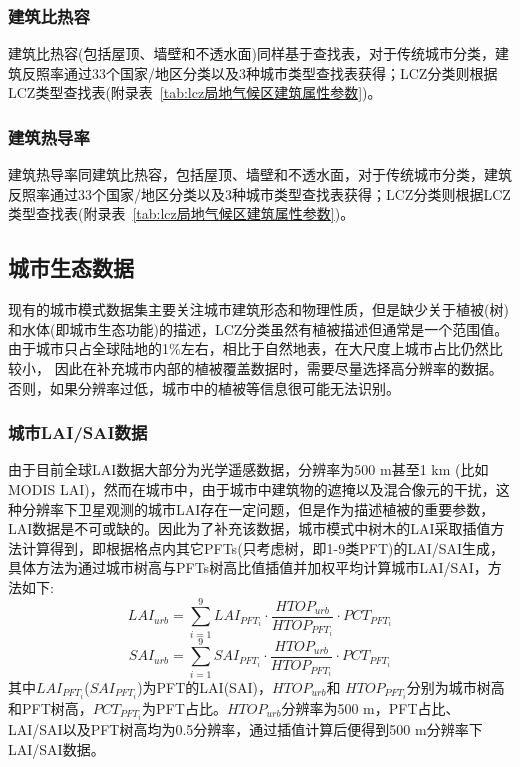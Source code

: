 \subsubsection{建筑比热容}\label{建筑比热容}
建筑比热容(包括屋顶、墙壁和不透水面)同样基于查找表，对于传统城市分类，建筑反照率通过33个国家/地区分类以及3种城市类型查找表获得；LCZ分类则根据LCZ类型查找表(附录表~\ref{tab:lcz局地气候区建筑属性参数})。

\subsubsection{建筑热导率}\label{建筑热导率}
建筑热导率同建筑比热容，包括屋顶、墙壁和不透水面，对于传统城市分类，建筑反照率通过33个国家/地区分类以及3种城市类型查找表获得；LCZ分类则根据LCZ类型查找表(附录表~\ref{tab:lcz局地气候区建筑属性参数})。

\subsection{城市生态数据}\label{城市生态数据}
现有的城市模式数据集主要关注城市建筑形态和物理性质，但是缺少关于植被(树)和水体(即城市生态功能)的描述，LCZ分类虽然有植被描述但通常是一个范围值。由于城市只占全球陆地的1\%左右，相比于自然地表，在大尺度上城市占比仍然比较小，
因此在补充城市内部的植被覆盖数据时，需要尽量选择高分辨率的数据。否则，如果分辨率过低，城市中的植被等信息很可能无法识别。

\subsubsection{城市LAI/SAI数据}\label{城市LAISAI数据}
由于目前全球LAI数据大部分为光学遥感数据，分辨率为500 m甚至1 km (比如MODIS LAI)，然而在城市中，由于城市中建筑物的遮掩以及混合像元的干扰，这种分辨率下卫星观测的城市LAI存在一定问题，但是作为描述植被的重要参数，LAI数据是不可或缺的。因此为了补充该数据，城市模式中树木的LAI采取插值方法计算得到，即根据格点内其它PFTs(只考虑树，即1-9类PFT)的LAI/SAI生成，具体方法为通过城市树高与PFTs树高比值插值并加权平均计算城市LAI/SAI，方法如下:
\begin{equation}
LAI_{urb}=\sum_{i=1}^{9} LAI_{PFT_{i}} \cdot \frac{HTOP_{urb}}{HTOP_{PFT_{i}}} \cdot PCT_{PFT_{i}}
\end{equation}
\begin{equation}
SAI_{urb}=\sum_{i=1}^{9} SAI_{PFT_{i}} \cdot \frac{HTOP_{urb}}{HTOP_{PFT_{i}}} \cdot PCT_{PFT_{i}}
\end{equation}
其中$LAI_{PFT_{i}}$($SAI_{PFT_{i}}$)为PFT的LAI(SAI)，$HTOP_{urb}$和 $HTOP_{PFT_{i}}$分别为城市树高和PFT树高，$PCT_{PFT_{i}}$为PFT占比。$HTOP_{urb}$分辨率为500 m，PFT占比、LAI/SAI以及PFT树高均为0.5\textdegree{}分辨率，通过插值计算后便得到500 m分辨率下LAI/SAI数据。

